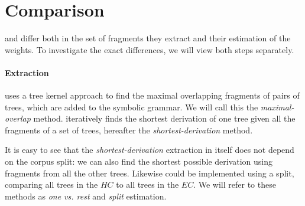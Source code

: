
\section{Comparison} \label{sec:Comparison}
\dops{} and \ddop{} differ both in the set of fragments they extract and their estimation of the weights. To investigate the exact differences, we will view both steps separately.


\paragraph{Extraction}
\ddop{} uses a tree kernel approach to find the maximal overlapping fragments of pairs of trees, which are added to the symbolic grammar. We will call this the \emph{maximal-overlap} method. \dops{} iteratively finds the shortest derivation of one tree given all the fragments of a set of trees, hereafter the \emph{shortest-derivation} method. 

It is easy to see that the \emph{shortest-derivation} extraction in itself does not depend on the corpus split: we can also find the shortest possible derivation using fragments from all the other trees. Likewise \ddop{} could be implemented using a split, comparing all trees in the $HC$ to all trees in the $EC$.
We will refer to these methods as \emph{one vs. rest} and \emph{split} estimation.



